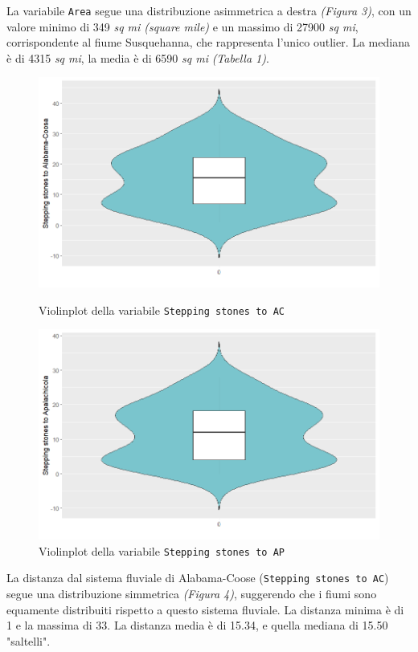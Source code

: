 \documentclass{article} %
\begin{document}
La variabile \texttt{Area} segue una distribuzione asimmetrica a destra \textit{(Figura 3)}, con un valore minimo di 349 \textit{sq mi (square mile)} e un massimo di 27900 \textit{sq mi}, corrispondente al fiume Susquehanna, che rappresenta l'unico outlier. La mediana è di 4315 \textit{sq mi}, la media è di 6590 \textit{sq mi} \textit{(Tabella 1)}.

\begin{figure}[H]
    \centering
    \begin{minipage}{0.49\textwidth}
        \centering
        \includegraphics[width=\textwidth]{immagini/vp_ac.png}
        \captionsetup{justification=centering}
        \caption{Violinplot della variabile \texttt{Stepping stones to AC}}
    \end{minipage}
    \hfill
    \begin{minipage}{0.49\textwidth}
        \centering
        \includegraphics[width=\textwidth]{immagini/vp_ap.png}
        \captionsetup{justification=centering}
        \caption{Violinplot della variabile \texttt{Stepping stones to AP}}
    \end{minipage}
\end{figure}
La distanza dal sistema fluviale di Alabama-Coose (\texttt{Stepping stones to AC}) segue una distribuzione simmetrica \textit{(Figura 4)}, suggerendo che i fiumi sono equamente distribuiti rispetto a questo sistema fluviale. La distanza minima è di 1 e la massima di 33. La distanza media è di 15.34, e quella mediana di 15.50 "saltelli".
\end{document}
